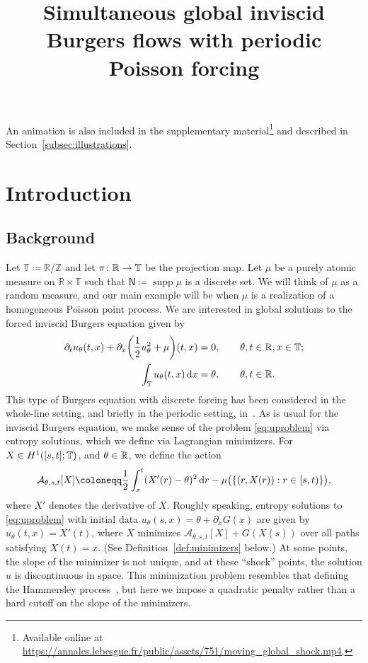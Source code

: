 \documentclass[AHL,Unicode,longabstracts]{cedram}
\title[Simultaneous global inviscid periodic Burgers flows]{Simultaneous global inviscid Burgers flows with periodic Poisson forcing}
\author[\initial{A.} \lastname{Dunlap}]{\firstname{Alexander} \lastname{Dunlap}}
\newcommand*\ssN{\mathsf{N}}
\newcommand*\TT{\mathbb{T}}
\newcommand*\RR{\mathbb{R}}
\newcommand*\ZZ{\mathbb{Z}}
\newcommand{\clA}{\mathcal{A}}
\newcommand*\st{\mathrel{:}}
\DeclareMathOperator{\supp}{supp}
\newcommand*\dif{\mathrm{d}}
\renewcommand*{\to}{\mathchoice{\longrightarrow}{\rightarrow}{\rightarrow}{\rightarrow}}
\let\oldin\in
\renewcommand{\in}{\mathchoice{\oldin}{\oldin}{\,\oldin\,}{\,\oldin\,}}
\let\originalleft\left
\let\originalright\right
\renewcommand{\left}{\mathopen{}\mathclose\bgroup\originalleft}
\renewcommand{\right}{\aftergroup\egroup\originalright}
\newcommand*\TT{\mathbb{T}}
\newcommand*\RR{\mathbb{R}}
\newcommand*\ZZ{\mathbb{Z}}
\begin{document}
\maketitle



\tableofcontents{}
\listoffigures{\phantom{scriptsize}}

An animation is also included in the supplementary material\footnote{Available online at~\url{
https://annales.lebesgue.fr/public/assets/751/moving\_global\_shock.mp4}.} and described in Section~\ref{subsec:illustrations}.

\section{Introduction}

\subsection{Background}

Let $\TT\coloneqq\RR/\ZZ$ and let $\pi\colon\RR\to\TT$ be the projection map. Let $\mu$ be a purely atomic measure on $ \RR\times\TT$ such that $\ssN\coloneqq\supp\mu$ is a discrete set. We will think of $\mu$ as a random measure, and our main example will be when $\mu$ is a realization of a homogeneous Poisson point process. We are interested in global solutions to the forced inviscid Burgers equation given by
\begin{subequations}\label{eq:uproblem}
\begin{align}
\partial_{t}u_{\theta}(t,x)+\partial_{x}\left(\frac{1}{2}u_{\theta}^{2}+\mu\right)(t,x) & =0,\qquad\theta,t\in\RR,x\in\TT;\label{eq:ueqn}
\\
\int_{\TT}u_{\theta}(t,x)\,\dif x & =\theta,\qquad\theta,t\in\RR.\label{eq:uintegral}
\end{align}
\end{subequations}
This type of Burgers equation with discrete forcing has been considered in the whole-line setting, and briefly in the periodic setting, in~\cite{Bak13,BCK14}. As is usual for the inviscid Burgers equation, we make sense of the problem \eqref{eq:uproblem} via entropy solutions, which we define via Lagrangian minimizers. For $X\in H^{1}([s,t];\TT)$, and $\theta\in\RR$, we define the action
\begin{equation}\label{eq:Adef}
\clA_{\theta,s,t}[X]\coloneqq\frac{1}{2}\int_{s}^{t}(X'(r)-\theta)^{2}\,\dif r-\mu\bigl(\{(r,X(r))\st r\in[s,t)\}\bigr),
\end{equation}
where $X'$ denotes the derivative of $X$. Roughly speaking, entropy solutions to \eqref{eq:uproblem} with initial data $u_{\theta}(s,x)=\theta+\partial_{x}G(x)$ are given by $u_{\theta}(t,x)=X'(t)$, where $X$ minimizes $\clA_{\theta,s,t}[X]+G(X(s))$ over all paths satisfying $X(t)=x$. (See Definition~\ref{def:minimizers} below.) At some points, the slope of the minimizer is not unique, and at these ``shock'' points, the solution $u$ is discontinuous in space. This minimization problem resembles that defining the Hammersley process~\cite{AD95,Ham72}, but here we impose a quadratic penalty rather than a hard cutoff on the slope of the minimizers.
\end{document}
